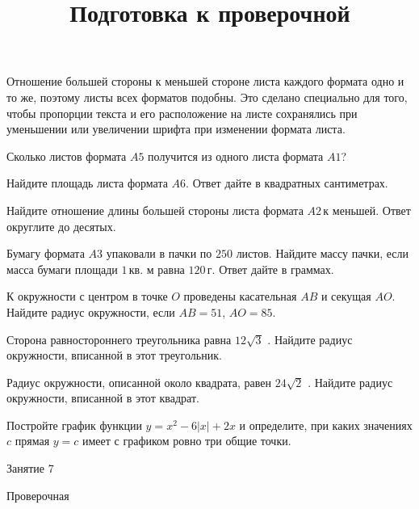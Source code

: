 \begin{homework}[number=3]
\begin{listofex}
\begin{center}
		\end{center}
		Отношение большей стороны к меньшей стороне листа каждого формата одно и то же, поэтому листы всех форматов подобны. Это сделано специально для того, чтобы пропорции текста и его расположение на листе сохранялись при уменьшении или увеличении шрифта при изменении формата листа.
		\item Сколько листов формата \( A5 \) получится из одного листа формата \( A1 \)?
		\item Найдите площадь листа формата \( A6 \). Ответ дайте в квадратных сантиметрах.
		\item Найдите отношение длины большей стороны листа формата \( A2 \) к меньшей. Ответ округлите до десятых.
		\item Бумагу формата \( A3 \) упаковали в пачки по \( 250 \) листов. Найдите массу пачки, если масса бумаги площади \( 1 \) кв. м равна \( 120 \) г. Ответ дайте в граммах.
		\item К окружности с центром в точке \( O \) проведены касательная \( AB \) и секущая \( AO \). Найдите радиус окружности, если \( AB=51 \), \( AO=85 \).
		\item Сторона равностороннего треугольника равна \( 12\sqrt{3} \) . Найдите радиус окружности, вписанной в этот треугольник.
		\item Радиус окружности, описанной около квадрата, равен \( 24\sqrt{2} \) . Найдите радиус окружности, вписанной в этот квадрат.
		\item Постройте график функции \( y=x^2-6|x|+2x \)  и определите, при каких значениях \( c \) прямая \( y=c \) имеет с графиком ровно три общие точки.
	\end{listofex}
\end{homework}

\begin{class}[number=7]
	\title{Подготовка к проверочной}
	\begin{listofex}
		\item Занятие 7
	\end{listofex}
\end{class}

\begin{exam}
	\begin{listofex}
		\item Проверочная
	\end{listofex}
\end{exam}

